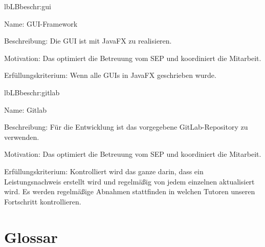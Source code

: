 \begin{description}[leftmargin=5em, style=sameline]
	\begin{lhp}{lb}{LB}{beschr:gui}
		\item [Name:] GUI-Framework
		\item [Beschreibung:] Die GUI ist mit JavaFX zu realisieren.
		\item [Motivation:] Das optimiert die Betreuung vom SEP und koordiniert die Mitarbeit.
		\item [Erfüllungskriterium:] Wenn alle GUIs in JavaFX geschrieben wurde.
	\end{lhp}
	
	\begin{lhp}{lb}{LB}{beschr:gitlab}
		\item [Name:] Gitlab
		\item [Beschreibung:] Für die Entwicklung ist das vorgegebene GitLab-Repository zu verwenden.
		\item [Motivation:] Das optimiert die Betreuung vom SEP und koordiniert die Mitarbeit.
		\item [Erfüllungskriterium:] Kontrolliert wird das ganze darin, dass ein Leistungsnachweis erstellt wird und regelmäßig von jedem einzelnen aktualisiert wird. Es werden regelmäßige Abnahmen stattfinden in welchen Tutoren unseren Fortschritt kontrollieren. 
	\end{lhp}
	
	
\end{description}

\section{Glossar}

